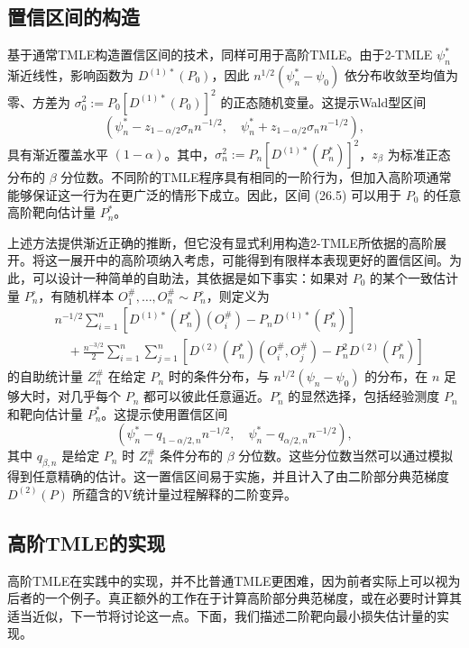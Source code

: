 \subsection{置信区间的构造}

基于通常TMLE构造置信区间的技术，同样可用于高阶TMLE。由于2-TMLE $\psi_n^*$ 渐近线性，影响函数为 $D^{(1)*}(P_0)$，因此 $n^{1/2}(\psi_n^*-\psi_0)$ 依分布收敛至均值为零、方差为 $\sigma_0^2:=P_0[D^{(1)*}(P_0)]^2$ 的正态随机变量。这提示Wald型区间
\begin{equation}
\left(\psi_n^*-z_{1-\alpha/2}\sigma_nn^{-1/2},\quad
\psi_n^*+z_{1-\alpha/2}\sigma_nn^{-1/2}\right),
\tag{26.5}
\end{equation}
具有渐近覆盖水平 $(1-\alpha)$。其中，$\sigma_n^2:=P_n[D^{(1)*}(P_n^*)]^2$，$z_\beta$ 为标准正态分布的 $\beta$ 分位数。不同阶的TMLE程序具有相同的一阶行为，但加入高阶项通常能够保证这一行为在更广泛的情形下成立。因此，区间 (26.5) 可以用于 $P_0$ 的任意高阶靶向估计量 $P_n^*$。

上述方法提供渐近正确的推断，但它没有显式利用构造2-TMLE所依据的高阶展开。将这一展开中的高阶项纳入考虑，可能得到有限样本表现更好的置信区间。为此，可以设计一种简单的自助法，其依据是如下事实：如果对 $P_0$ 的某个一致估计量 $P_n^\circ$，有随机样本 $O_1^\#,\ldots,O_n^\#\sim P_n^\circ$，则定义为
\[
\begin{aligned}
&n^{-1/2}\sum_{i=1}^n
\left[D^{(1)*}(P_n^*)(O_i^\#)-P_nD^{(1)*}(P_n^*)\right]\\
&\quad+\frac{n^{-3/2}}2\sum_{i=1}^n\sum_{j=1}^n
\left[D^{(2)}(P_n^*)(O_i^\#,O_j^\#)-P_n^2D^{(2)}(P_n^*)\right]
\end{aligned}
\]
的自助统计量 $Z_n^\#$ 在给定 $P_n$ 时的条件分布，与 $n^{1/2}(\psi_n-\psi_0)$ 的分布，在 $n$ 足够大时，对几乎每个 $P_n$ 都可以彼此任意逼近。$P_n^\circ$ 的显然选择，包括经验测度 $P_n$ 和靶向估计量 $P_n^*$。这提示使用置信区间
\[
\left(\psi_n^*-q_{1-\alpha/2,n}n^{-1/2},\quad
\psi_n^*-q_{\alpha/2,n}n^{-1/2}\right),
\]
其中 $q_{\beta,n}$ 是给定 $P_n$ 时 $Z_n^\#$ 条件分布的 $\beta$ 分位数。这些分位数当然可以通过模拟得到任意精确的估计。这一置信区间易于实施，并且计入了由二阶部分典范梯度 $D^{(2)}(P)$ 所蕴含的V统计量过程解释的二阶变异。

\subsection{高阶TMLE的实现}

高阶TMLE在实践中的实现，并不比普通TMLE更困难，因为前者实际上可以视为后者的一个例子。真正额外的工作在于计算高阶部分典范梯度，或在必要时计算其适当近似，下一节将讨论这一点。下面，我们描述二阶靶向最小损失估计量的实现。

